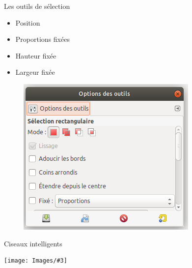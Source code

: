\documentclass[10pt,svgnames,usenames,table]{beamer}
\newcommand{\tool}[3]{%
	\begin{minipage}{0.40\textwidth}
	\item #1	
	\end{minipage}\hfill
	\begin{minipage}{0.20\textwidth}
	\begin{flushright}
	\keys{#2}
	\end{flushright}
	\end{minipage}
	\begin{minipage}{0.06\textwidth}
	\fbox{ou}
	\end{minipage}
	\begin{minipage}{0.1\textwidth}
	\texttt{[image: Images/\#3]}
	\end{minipage}
}
\begin{document}
\begin{frame}[allowframebreaks]{Les outils de sélection}
\begin{enumerate}
\begin{minipage}[t]{0.45\textwidth}
	\begin{itemize}
		\item Position
		\item Proportions fixées
		\item Hauteur fixée
		\item Largeur fixée
	\end{itemize}
	\end{minipage}
	\begin{minipage}[t]{0.45\textwidth}
	
	\begin{figure}
        	\centering
        	\includegraphics[width=\textwidth]{Images/option_outil} 
	\end{figure}
	\end{minipage}
	
	\framebreak 
	
	
	
	
	\tool{Ciseaux intelligents}{I}{smart_cut.png}
	

\end{enumerate}
\end{frame}
\end{document}
